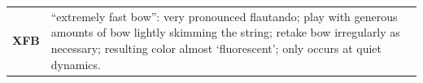 \documentclass[10pt]{article}
\begin{document}
%
\hfill
%
\begin{tabular}[t]{p{2cm} p{5cm}}
\textbf{XFB} & ``extremely fast bow'': very pronounced flautando;
    play with generous amounts of bow lightly skimming the string;
    retake bow irregularly as necessary;
    resulting color almost `fluorescent';
    only occurs at quiet dynamics.
    \\ 
\end{tabular}
\end{document}
